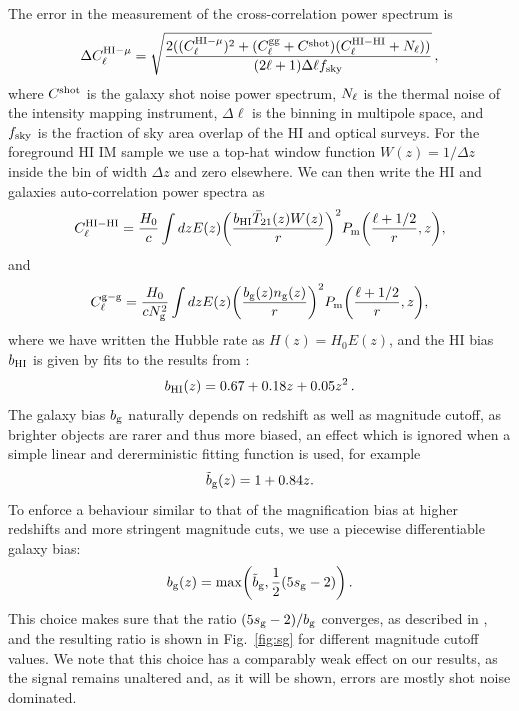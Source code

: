 \documentclass[useAMS,usenatbib]{mnras}
\newcommand{\be}{\begin{equation}}
\newcommand{\ee}{\end{equation}}
\begin{document}
The error in the measurement of the cross-correlation power spectrum is
\be
\label{eq:magerr}
\Delta C^{{\rm HI} - \mu}_\ell = \sqrt{\frac{2((C^{{\rm HI} - \mu}_\ell)^2+(C^{\rm gg}_\ell+C^{\rm shot})(C^{\rm HI-HI}_\ell+N_\ell))}{(2\ell+1)\Delta \ell f_{\rm sky}}} \, ,
\ee where $C^{\rm shot}$ is the galaxy shot noise power spectrum, $N_{\rm \ell}$ is the thermal noise of the intensity mapping instrument, $\Delta \ell$ is the binning in multipole space, and $f_{\rm sky}$ is the fraction of sky area overlap of the HI and optical surveys. For the foreground HI IM sample we use a top-hat window function $W(z)=1/\Delta z$ inside the bin of width $\Delta z$ and zero elsewhere. We can then write the HI and galaxies auto-correlation power spectra as
\begin{equation}
C_\ell^{\rm HI-HI} = \frac{H_0}{c} \int dz E(z) \biggl( \frac{ b_{\rm HI}\bar{T}_{21}(z) W(z)}{r}\biggr)^2 P_{\rm m} \biggl( \frac{\ell + 1/2}{r}, z \biggr),
\end{equation}
and
\begin{equation}
  \label{eq:clgal}
C_\ell^{{\rm g-g}} = \frac{H_0}{cN_{\rm g}^2} \int dz E(z) \biggl( \frac{ b_{\rm g }(z) n_{\rm g}(z)}{r}\biggr)^2 P_{\rm m} \biggl( \frac{\ell + 1/2}{r}, z \biggr),
\end{equation}
where we have written the Hubble rate as $H(z) = H_0E(z)$, and the HI bias $b_{\rm HI}$ is given by fits to the results from \cite{0004-637X-814-2-145}:
\begin{equation}
  b_{\rm HI}(z) = 0.67 + 0.18 z + 0.05 z^2 \, .
\end{equation}
The galaxy bias $b_{\rm g}$ naturally depends on redshift as well as magnitude cutoff, as brighter objects are rarer and thus more biased, an effect which is ignored when a simple linear and dererministic fitting function is used, for example
\begin{equation}
  \tilde{b}_{\rm g}(z) = 1+0.84 z.
  \label{eq:mag_gbiasfit}
\end{equation}
To enforce a behaviour similar to that of the magnification bias at higher redshifts and more stringent magnitude cuts, we use a piecewise differentiable galaxy bias:
\begin{equation}
  b_{\rm g}(z) = {\rm max}\biggl( \tilde{b}_{\rm g}, \frac{1}{2} (5s_{\rm g}-2)\biggr) \, .
  \label{eq:mag_gbias}
\end{equation}
This choice makes sure that the ratio $(5s_{\rm g}-2)/b_{\rm g}$ converges, as described in \citep{2007PhRvD..76j3502H}, and the resulting ratio is shown in  Fig.~\ref{fig:sg} for different magnitude cutoff values. We note that this choice has a comparably weak effect on our results, as the signal remains unaltered and, as it will be shown, errors are mostly shot noise dominated.
\end{document}

